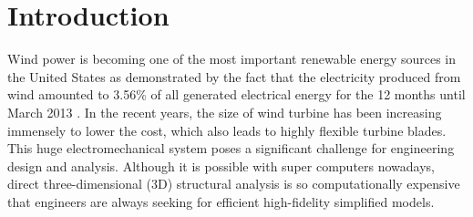 \documentclass{aiaa-tc}
\begin{document}
\section{Introduction}
Wind power is becoming one of the most important renewable energy sources in the United States as demonstrated by the fact that the electricity produced from wind amounted to 3.56\% of all generated electrical energy for the 12 months until March 2013 \cite{WindWiki}. In the recent years, the size of wind turbine has been increasing immensely to lower the cost, which also leads to highly flexible turbine blades. This huge electromechanical system poses a significant challenge for engineering design and analysis. Although it is possible with super computers nowadays, direct three-dimensional (3D) structural analysis is so computationally expensive that engineers are always seeking for efficient high-fidelity simplified models.
\end{document}

